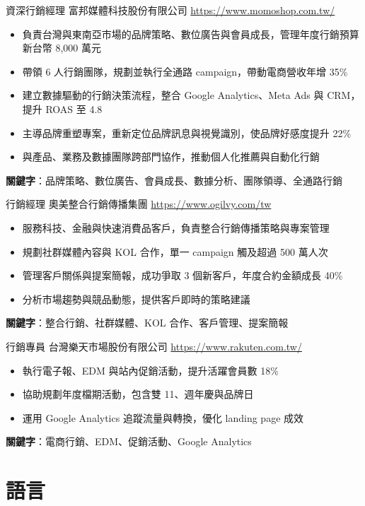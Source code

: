 \documentclass[a4paper, serif, 10pt]{moderncv}
\begin{document}
        {資深行銷經理}
        {富邦媒體科技股份有限公司}
        {\url{https://www.momoshop.com.tw/}}
        {}
        {\begin{itemize}
\item 負責台灣與東南亞市場的品牌策略、數位廣告與會員成長，管理年度行銷預算新台幣 8,000 萬元
\item 帶領 6 人行銷團隊，規劃並執行全通路 campaign，帶動電商營收年增 35\%
\item 建立數據驅動的行銷決策流程，整合 Google Analytics、Meta Ads 與 CRM，提升 ROAS 至 4.8
\item 主導品牌重塑專案，重新定位品牌訊息與視覺識別，使品牌好感度提升 22\%
\item 與產品、業務及數據團隊跨部門協作，推動個人化推薦與自動化行銷
\end{itemize}
\textbf{關鍵字}：品牌策略、數位廣告、會員成長、數據分析、團隊領導、全通路行銷}

        {行銷經理}
        {奧美整合行銷傳播集團}
        {\url{https://www.ogilvy.com/tw}}
        {}
        {\begin{itemize}
\item 服務科技、金融與快速消費品客戶，負責整合行銷傳播策略與專案管理
\item 規劃社群媒體內容與 KOL 合作，單一 campaign 觸及超過 500 萬人次
\item 管理客戶關係與提案簡報，成功爭取 3 個新客戶，年度合約金額成長 40\%
\item 分析市場趨勢與競品動態，提供客戶即時的策略建議
\end{itemize}
\textbf{關鍵字}：整合行銷、社群媒體、KOL 合作、客戶管理、提案簡報}

        {行銷專員}
        {台灣樂天市場股份有限公司}
        {\url{https://www.rakuten.com.tw/}}
        {}
        {\begin{itemize}
\item 執行電子報、EDM 與站內促銷活動，提升活躍會員數 18\%
\item 協助規劃年度檔期活動，包含雙 11、週年慶與品牌日
\item 運用 Google Analytics 追蹤流量與轉換，優化 landing page 成效
\end{itemize}
\textbf{關鍵字}：電商行銷、EDM、促銷活動、Google Analytics}
\section{語言}

\end{document}
